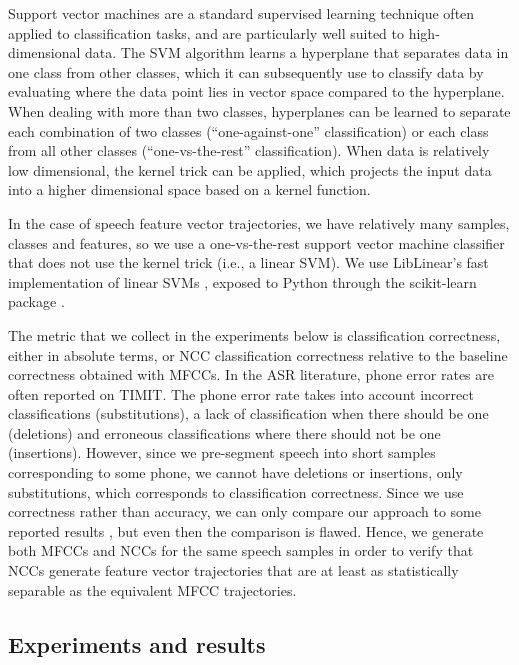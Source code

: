 Support vector machines are a standard
supervised learning technique
often applied to classification tasks,
and are particularly well suited
to high-dimensional data.
The SVM algorithm learns a hyperplane
that separates data
in one class from other classes,
which it can subsequently use
to classify data
by evaluating where the data point
lies in vector space compared to the hyperplane.
When dealing with more than two classes,
hyperplanes can be learned to separate
each combination of two classes
(``one-against-one'' classification)
or each class from all other classes
(``one-vs-the-rest'' classification).
When data is relatively low dimensional,
the kernel trick can be applied,
which projects the input data
into a higher dimensional space
based on a kernel function.

In the case of speech feature vector trajectories,
we have relatively many samples,
classes and features,
so we use a one-vs-the-rest
support vector machine classifier
that does not use the kernel trick
(i.e., a linear SVM).
We use LibLinear's fast implementation
of linear SVMs \citep{fan2008},
exposed to Python through
the scikit-learn package
\citep{pedregosa2011}.

The metric that we collect
in the experiments below
is classification correctness,
either in absolute terms,
or NCC classification correctness
relative to the baseline correctness
obtained with MFCCs.
In the ASR literature,
phone error rates are often
reported on TIMIT.
The phone error rate
takes into account
incorrect classifications
(substitutions),
a lack of classification
when there should be one
(deletions)
and erroneous classifications
where there should not be one
(insertions).
However, since we pre-segment
speech into short samples
corresponding to some phone,
we cannot have deletions or insertions,
only substitutions,
which corresponds to classification correctness.
Since we use correctness
rather than accuracy,
we can only compare our approach
to some reported results
\citep{lopes2011},
but even then the comparison is flawed.
Hence, we generate both MFCCs
and NCCs for the same speech samples
in order to verify that
NCCs generate feature vector trajectories
that are at least as statistically separable
as the equivalent MFCC trajectories.

\subsection{Experiments and results}

